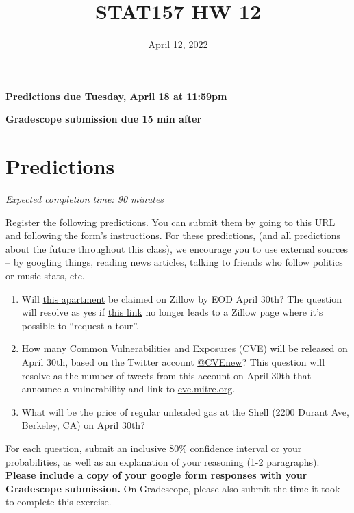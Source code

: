 \documentclass[11pt]{article}
\title{STAT157 HW 12}
\date{April 12, 2022}
\begin{document}
\maketitle

\hfill \textbf{Predictions due Tuesday, April 18 at 11:59pm}

\hfill \textbf{Gradescope submission due 15 min after}

\section*{Predictions}

\emph{Expected completion time: 90 minutes}

Register the following predictions. You can submit them by going to \href{https://docs.google.com/forms/d/1GtTv93jJqtHLPuYAle5L9XQFdcTDxNm-hsitq9hiK4w/edit}{this URL} and following the form's instructions. For these predictions, (and all predictions about the future throughout this class), we encourage you to use external sources -- by googling things, reading news articles, talking to friends who follow politics or music stats, etc.

\begin{enumerate}
	\item Will \href{https://www.zillow.com/homedetails/1026-Grizzly-Peak-Blvd-Berkeley-CA-94708/2058146195_zpid/}{this apartment} be claimed on Zillow by EOD April 30th? The question will resolve as yes if \href{https://www.zillow.com/homedetails/1026-Grizzly-Peak-Blvd-Berkeley-CA-94708/2058146195_zpid/}{this link} no longer leads to a Zillow page where it's possible to ``request a tour''.
	\item How many Common Vulnerabilities and Exposures (CVE) will be released on April 30th, based on the Twitter account \href{https://twitter.com/CVEnew?ref_src=twsrc}{@CVEnew}? This question will resolve as the number of tweets from this account on April 30th that announce a vulnerability and link to \url{cve.mitre.org}.
	\item What will be the price of regular unleaded gas at the Shell (2200 Durant Ave, Berkeley, CA) on April 30th?
\end{enumerate}
For each question, submit an inclusive 80\% confidence interval or your probabilities, as well as an explanation of your reasoning (1-2 paragraphs).
\textbf{Please include a copy of your google form responses with your Gradescope submission.}
On Gradescope, please also submit the time it took to complete this exercise.
\end{document}
